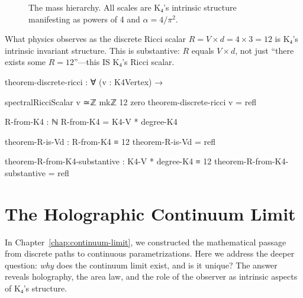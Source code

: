 \documentclass[11pt,a4paper]{book}
\begin{document}
\begin{figure}[h]
\centering
{}
\caption{The mass hierarchy. All scales are K₄'s intrinsic structure manifesting as powers of 4 and $\alpha = 4/\pi^2$.}
\label{fig:mass-hierarchy}
\end{figure}

What physics observes as the discrete Ricci scalar $R = V \times d = 4 \times 3 = 12$ is K₄'s intrinsic invariant structure. This is substantive: $R$ equals $V \times d$, not just ``there exists some $R = 12$''—this IS K₄'s Ricci scalar.

\begin{code}
theorem-discrete-ricci : ∀ (v : K4Vertex) → 

  spectralRicciScalar v ≃ℤ mkℤ 12 zero
theorem-discrete-ricci v = refl

R-from-K4 : ℕ
R-from-K4 = K4-V * degree-K4

theorem-R-is-Vd : R-from-K4 ≡ 12
theorem-R-is-Vd = refl

theorem-R-from-K4-substantive : K4-V * degree-K4 ≡ 12
theorem-R-from-K4-substantive = refl

\end{code}

\chapter{The Holographic Continuum Limit}
\label{chap:continuum-holographic}

In Chapter~\ref{chap:continuum-limit}, we constructed the mathematical passage from 
discrete paths to continuous parametrizations. Here we address the deeper question: 
\emph{why} does the continuum limit exist, and is it unique? The answer reveals holography, 
the area law, and the role of the observer as intrinsic aspects of K₄'s structure.
\end{document}

